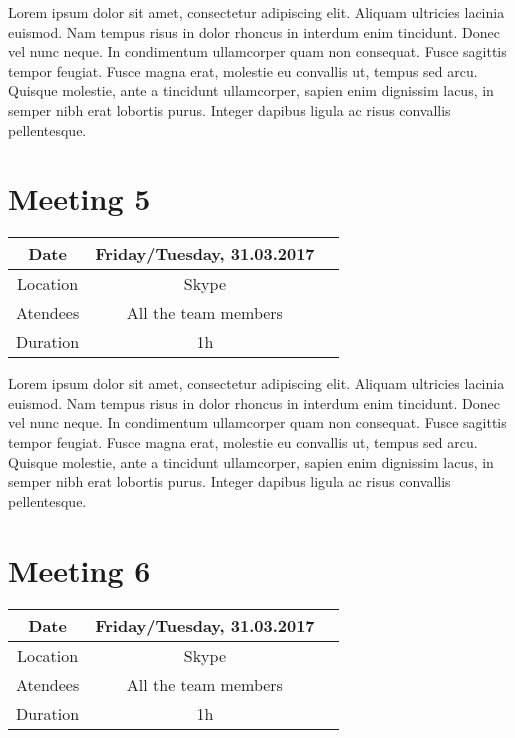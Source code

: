 Lorem ipsum dolor sit amet, consectetur adipiscing elit. Aliquam ultricies lacinia euismod. Nam tempus risus in dolor rhoncus in interdum enim tincidunt. Donec vel nunc neque. In condimentum ullamcorper quam non consequat. Fusce sagittis tempor feugiat. Fusce magna erat, molestie eu convallis ut, tempus sed arcu. Quisque molestie, ante a tincidunt ullamcorper, sapien enim dignissim lacus, in semper nibh erat lobortis purus. Integer dapibus ligula ac risus convallis pellentesque.

\section{Meeting 5}
\begin{center}
	\begin{tabular}{| c | c | c }
		\hline
		Date & Friday/Tuesday, 	31.03.2017   \\
		\hline
		Location & Skype  \\  
		\hline
		Atendees & All the team members   \\
		\hline
		Duration & 1h  \\
		\hline
	\end{tabular}	
\end{center}


Lorem ipsum dolor sit amet, consectetur adipiscing elit. Aliquam ultricies lacinia euismod. Nam tempus risus in dolor rhoncus in interdum enim tincidunt. Donec vel nunc neque. In condimentum ullamcorper quam non consequat. Fusce sagittis tempor feugiat. Fusce magna erat, molestie eu convallis ut, tempus sed arcu. Quisque molestie, ante a tincidunt ullamcorper, sapien enim dignissim lacus, in semper nibh erat lobortis purus. Integer dapibus ligula ac risus convallis pellentesque.

\section{Meeting 6}
\begin{center}
	\begin{tabular}{| c | c | c }
		\hline
		Date & Friday/Tuesday, 	31.03.2017   \\
		\hline
		Location & Skype  \\  
		\hline
		Atendees & All the team members   \\
		\hline
		Duration & 1h  \\
		\hline
	\end{tabular}	
\end{center}


